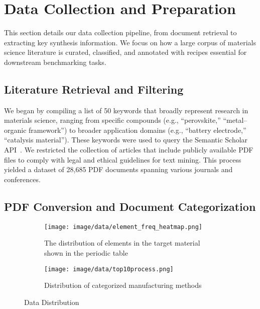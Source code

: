 \section{Data Collection and Preparation}
\label{sec:data_collection}

This section details our data collection pipeline, from document retrieval to extracting key synthesis information. We focus on how a large corpus of materials science literature is curated, classified, and annotated with recipes essential for downstream benchmarking tasks.

\subsection{Literature Retrieval and Filtering}
We began by compiling a list of 50 keywords that broadly represent research in materials science, ranging from specific compounds (e.g., ``perovskite,'' ``metal--organic framework'') to broader application domains (e.g., ``battery electrode,'' ``catalysis material''). These keywords were used to query the Semantic Scholar API~\cite{semanticscholar2023}. We restricted the collection of articles that include publicly available PDF files to comply with legal and ethical guidelines for text mining. This process yielded a dataset of 28,685 PDF documents spanning various journals and conferences. 

\subsection{PDF Conversion and Document Categorization}


\begin{figure*}[!ht]
    \begin{subfigure}{.55\textwidth}
        \centering
        \texttt{[image: image/data/element\_freq\_heatmap.png]}
        \caption{The distribution of elements in the target material shown in the periodic table}
        \label{fig:data-element-distribution}
    \end{subfigure}
    \begin{subfigure}{.43\textwidth}
        \centering
        \texttt{[image: image/data/top10process.png]}
        \caption{Distribution of categorized manufacturing methods}
        \label{fig:data-process-distribution}
    \end{subfigure}
    \caption{Data Distribution}
    \label{fig:main-data-distribution}
\end{figure*}


